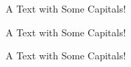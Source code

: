 \documentclass[parskip=half-]{scrartcl}
\begin{document}
\selectfont
A Text with Some Capitals!

\large
A Text with Some Capitals!

\scriptsize
A Text with Some Capitals!
\end{document}
